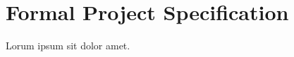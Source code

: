 \section{Formal Project Specification}
\label{sec:specv2}


Lorum ipsum sit dolor amet.  \lipsum[2-4]
